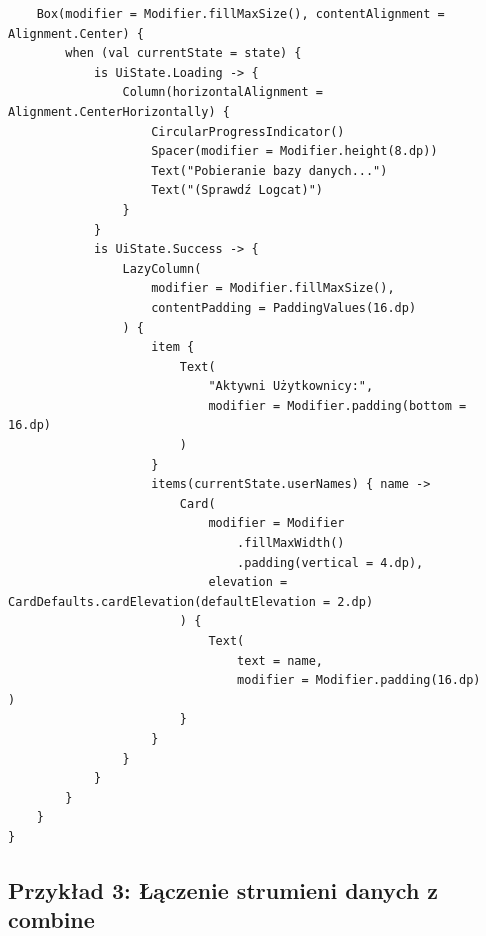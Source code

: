 \begin{verbatim}
    Box(modifier = Modifier.fillMaxSize(), contentAlignment = Alignment.Center) {
        when (val currentState = state) {
            is UiState.Loading -> {
                Column(horizontalAlignment = Alignment.CenterHorizontally) {
                    CircularProgressIndicator()
                    Spacer(modifier = Modifier.height(8.dp))
                    Text("Pobieranie bazy danych...")
                    Text("(Sprawdź Logcat)")
                }
            }
            is UiState.Success -> {
                LazyColumn(
                    modifier = Modifier.fillMaxSize(),
                    contentPadding = PaddingValues(16.dp)
                ) {
                    item {
                        Text(
                            "Aktywni Użytkownicy:",
                            modifier = Modifier.padding(bottom = 16.dp)
                        )
                    }
                    items(currentState.userNames) { name ->
                        Card(
                            modifier = Modifier
                                .fillMaxWidth()
                                .padding(vertical = 4.dp),
                            elevation = CardDefaults.cardElevation(defaultElevation = 2.dp)
                        ) {
                            Text(
                                text = name,
                                modifier = Modifier.padding(16.dp)                            )
                        }
                    }
                }
            }
        }
    }
}
\end{verbatim}

\subsection{Przykład 3: Łączenie strumieni danych z combine}

